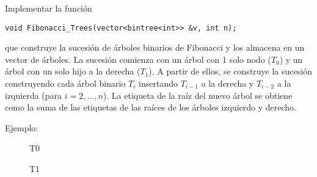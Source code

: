 \documentclass[12pt]{article}
\begin{document}
    \begin{ejercicio}[1 punto]
        Implementar la función
        \begin{verbatim}
void Fibonacci_Trees(vector<bintree<int>> &v, int n);
        \end{verbatim}
        que construye la sucesión de árboles binarios de Fibonacci y los almacena en un vector de árboles. La sucesión comienza con un árbol con 1 solo nodo ($T_0$) y un árbol con un solo hijo a la derecha ($T_1$). A partir de ellos, se construye la sucesión construyendo cada árbol binario $T_i$ insertando $T_{i-1}$ a la derecha y $T_{i-2}$ a la izquierda (para $i=2,\ldots,n$). La etiqueta de la raíz del nuevo árbol se obtiene como la suma de las etiquetas de las raíces de los árboles izquierdo y derecho.

        Ejemplo: 
    \begin{figure}[H]
    \centering
    \begin{minipage}{0.45\textwidth}
        \centering
        \caption{T0}
    \end{minipage}\hfill
    \begin{minipage}{0.45\textwidth}
        \centering
        \caption{T1}
    \end{minipage}
\end{figure}


\end{ejercicio}
\end{document}
